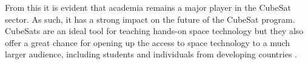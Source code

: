 From this it is evident that academia remains a major player in the CubeSat sector. As such, it has a strong impact on the future of the CubeSat program. CubeSats are an ideal tool for teaching hands-on space technology but they also offer a great chance for opening up the access to space technology to a much larger audience, including students and individuals from developing countries \cite{scholz2015toward}. 

